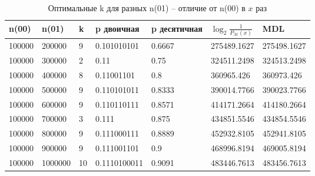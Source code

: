 \documentclass[12pt]{article}
\begin{document}
	\begin{table}[!h]
		\caption{Оптимальные k для разных n(01) -- отличие от n(00) в $x$ раз}
		\label{table:n00n01big}
		\begin{center}
			\begin{tabular}{|l|l|l|l|l|l|l|}
				\hline
				n(00) & n(01) & k & p двоичная & p десятичная & $\log_2{\frac{1}{P_{\mathcal{M}}(x)}}$ & MDL \\
				\hline 
				100000 & 200000 & 9 & 0.101010101 & 0.6667 & 275489.1627 & 275498.1627 \\ 
				\hline 
				100000 & 300000 & 2 & 0.11 & 0.75 & 324511.2498 & 324513.2498 \\ 
				\hline 
				100000 & 400000 & 8 & 0.11001101 & 0.8 & 360965.426 & 360973.426 \\ 
				\hline 
				100000 & 500000 & 9 & 0.110101011 & 0.8333 & 390014.7766 & 390023.7766 \\ 
				\hline 
				100000 & 600000 & 9 & 0.110110111 & 0.8571 & 414171.2664 & 414180.2664 \\ 
				\hline 
				100000 & 700000 & 3 & 0.111 & 0.875 & 434851.5546 & 434854.5546 \\ 
				\hline 
				100000 & 800000 & 9 & 0.111000111 & 0.8889 & 452932.8105 & 452941.8105 \\ 
				\hline 
				100000 & 900000 & 9 & 0.111001101 & 0.9 & 468996.8194 & 469005.8194 \\ 
				\hline 
				100000 & 1000000 & 10 & 0.1110100011 & 0.9091 & 483446.7613 & 483456.7613 \\ 
				\hline 
			\end{tabular}
		\end{center}
	\end{table}
\end{document}
